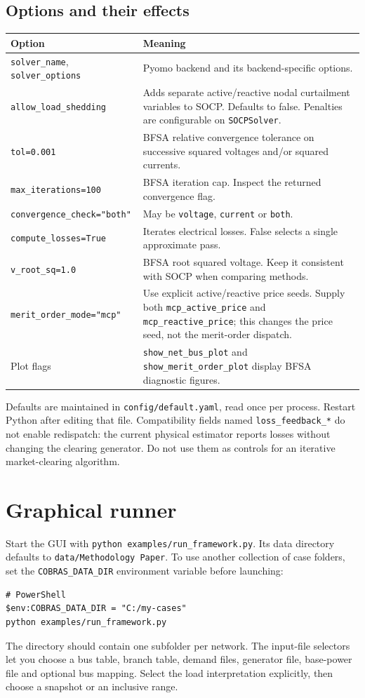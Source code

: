 \documentclass[11pt,a4paper]{article}
\newcommand{\code}[1]{\nolinkurl{#1}}
\begin{document}
\subsection{Options and their effects}
\begin{longtable}{p{.38\linewidth}p{.54\linewidth}}
\toprule Option & Meaning \\\midrule\endhead
\code{solver_name}, \code{solver_options} & Pyomo backend and its backend-specific options.\\
\code{allow_load_shedding} & Adds separate active/reactive nodal curtailment variables to SOCP. Defaults to false. Penalties are configurable on \code{SOCPSolver}.\\
\code{tol=0.001} & BFSA relative convergence tolerance on successive squared voltages and/or squared currents.\\
\code{max_iterations=100} & BFSA iteration cap. Inspect the returned convergence flag.\\
\code{convergence_check="both"} & May be \code{voltage}, \code{current} or \code{both}.\\
\code{compute_losses=True} & Iterates electrical losses. False selects a single approximate pass.\\
\code{v_root_sq=1.0} & BFSA root squared voltage. Keep it consistent with SOCP when comparing methods.\\
\code{merit_order_mode="mcp"} & Use explicit active/reactive price seeds. Supply both \code{mcp_active_price} and \code{mcp_reactive_price}; this changes the price seed, not the merit-order dispatch.\\
Plot flags & \code{show_net_bus_plot} and \code{show_merit_order_plot} display BFSA diagnostic figures.\\
\bottomrule
\end{longtable}
Defaults are maintained in \code{config/default.yaml}, read once per process.
Restart Python after editing that file. Compatibility fields named
\code{loss_feedback_*} do not enable redispatch: the current physical estimator
reports losses without changing the clearing generator. Do not use them as
controls for an iterative market-clearing algorithm.

\section{Graphical runner}
\label{sec:gui}
Start the GUI with \code{python examples/run_framework.py}. Its data directory
defaults to \code{data/Methodology Paper}. To use another collection of case
folders, set the \code{COBRAS_DATA_DIR} environment variable before launching:
\begin{lstlisting}
# PowerShell
$env:COBRAS_DATA_DIR = "C:/my-cases"
python examples/run_framework.py
\end{lstlisting}
The directory should contain one subfolder per network. The input-file
selectors let you choose a bus table, branch table, demand files, generator
file, base-power file and optional bus mapping. Select the load interpretation
explicitly, then choose a snapshot or an inclusive range.
\end{document}
